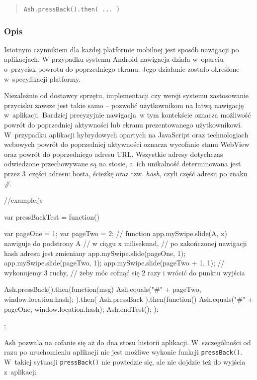 \documentclass{xmgr}
\begin{document}
\begin{quote}
  \texttt{Ash.pressBack().then( ... )} 
\end{quote}

\subsubsection{Opis}

Istotnym czynnikiem dla każdej platformie mobilnej jest sposób nawigacji po aplikacjach.  W przypadku systemu Android nawigacja działa w~oparciu o~przycisk powrotu do poprzedniego ekranu. Jego działanie zostało określone w~specyfikacji platformy.

Niezależnie od dostawcy sprzętu, implementacji czy wersji systemu zastosowanie przycisku zawsze jest takie samo -- pozwolić użytkownikom na łatwą nawigację w~aplikacji. Bardziej precyzyjnie nawigacja~w tym kontekście  oznacza możliwość powrót do poprzedniej aktywności lub ekranu prezentowanego użytkownikowi. W~przypadku aplikacji hybrydowych opartych na JavaScript oraz technologiach webowych powrót do poprzedniej aktywności oznacza wycofanie stanu WebView oraz powrót do poprzedniego adresu URL. Wszystkie adresy dotychczas odwiedzone przechowywane są na stosie, a~ich unikalność determinowana jest przez 3~części adresu: hosta, ścieżkę oraz tzw. \textit{hash}, czyli część adresu po znaku \textit{\#}. 

\begin{javascriptcode}
  //example.js

  var pressBackTest = function(){
    var pageOne = 1;
    var pageTwo = 2;
    // function app.mySwipe.slide(A, x) nawiguje do podstrony A 
    // w ciągu x milisekund,
    // po zakończonej nawigacji hash adresu jest zmieniany
    app.mySwipe.slide(pageOne, 1); 
    app.mySwipe.slide(pageTwo, 1); 
    app.mySwipe.slide(pageTwo + 1, 1); //  wykonujemy 3 ruchy, 
       //  żeby móc cofnąć się 2 razy i wrócić do punktu wyjścia 
    
    Ash.pressBack().then(function(msg){
      Ash.equals("#" + pageTwo, window.location.hash);
    }).then(
      Ash.pressBack
    ).then(function(){
      Ash.equals("#" + pageOne, window.location.hash);
      Ash.endTest();
    });
  };
\end{javascriptcode}

Ash pozwala na cofanie się aż do dna stosu historii aplikacji. W~szczególności od razu po uruchomieniu aplikacji nie jest możliwe wykonie funkcji \texttt{pressBack()}. W~takiej sytuacji \texttt{pressBack()} nie powiedzie się, ale nie dojdzie też do wyjścia z~aplikacji.
\end{document}
